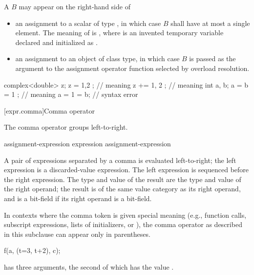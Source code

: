 \pnum
A  $B$ may appear on the right-hand side of

\begin{itemize}
\item
an assignment to a scalar of type , in which case $B$
shall have at most a single element.
The meaning of  is ,
where  is an invented temporary variable
declared and initialized as .

\item
an assignment to an object of class type, in which case $B$
is passed as the argument to the assignment operator function selected by
overload resolution.
\end{itemize}

\begin{example}
\begin{codeblock}
complex<double> z;
z = { 1,2 };        // meaning 
z += { 1, 2 };      // meaning 
int a, b;
a = b = { 1 };      // meaning 
a = { 1 } = b;      // syntax error
\end{codeblock}
\end{example}

[expr.comma]{Comma operator}%
%
%
%
%
%

\pnum
The comma operator groups left-to-right.

\begin{bnf}
\br
    assignment-expression\br
    expression \terminal{,} assignment-expression
\end{bnf}

A pair of expressions separated by a comma is evaluated left-to-right;
the left expression is
a discarded-value expression.
The left expression is sequenced before
the right expression.
%
The type and value of the
result are the type and value of the right operand; the result is of the same
value category as its right operand, and is a bit-field if its
right operand is a bit-field.

\pnum
\begin{note}
In contexts where the comma token is given special meaning
(e.g., function calls,
subscript expressions,
lists of initializers,
or ),
the comma operator as described in this subclause can appear only in parentheses.
\begin{example}
\begin{codeblock}
f(a, (t=3, t+2), c);
\end{codeblock}
has three arguments, the second of which has the value
.
\end{example}
\end{note}

